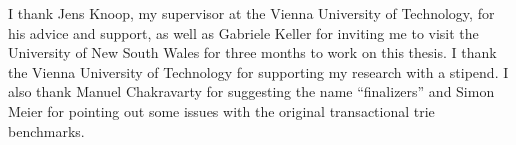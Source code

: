 \begin{acknowledgements*}

I thank Jens Knoop, my supervisor at the Vienna University of Technology, for his advice and support, as well as Gabriele Keller for inviting me to visit the University of New South Wales for three months to work on this thesis.
I thank the Vienna University of Technology for supporting my research with a stipend.
I also thank Manuel Chakravarty for suggesting the name ``finalizers'' and Simon Meier for pointing out some issues with the original transactional trie benchmarks.

\end{acknowledgements*}
